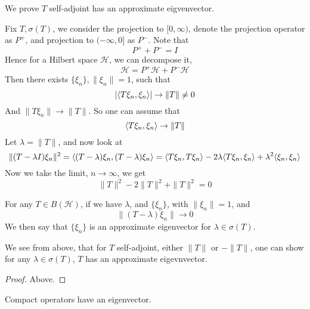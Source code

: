 \begin{proposition}
    We prove $T$ self-adjoint has an approximate eigvenvector.
\end{proposition}
Fix $T, \sigma(T)$, we consider the projection to $[0,\infty)$, denote the projection operator as $P^+$, and projection to $(-\infty, 0]$ as $P^-$. Note that 
\begin{equation*}
    P^++P^-=I 
\end{equation*}
Hence for a Hilbert space $\mathcal{H}$, we can decompose it,
\begin{equation*}
    \mathcal{H}=P^+\mathcal{H}+P^-\mathcal{H}
\end{equation*}
Then there exists $\{\xi_n\}, \|\xi_n\|=1$, such that 
\begin{equation*}
    |\langle T\xi_n, \xi_n\rangle|\to \|T\|\neq 0
\end{equation*}
And $\|T\xi_n\|\to \|T\|$. So one can assume that 
\begin{equation*}
    \langle T\xi_n, \xi_n\rangle\to \|T\|
\end{equation*}
Let $\lambda=\|T\|$, and now look at 
\begin{equation*}
    \|(T-\lambda I)\xi_n\|^2=\langle (T-\lambda)\xi_n, (T-\lambda)\xi_n\rangle=\langle T\xi_n, T\xi_n\rangle-2\lambda\langle T\xi_n, \xi_n\rangle +\lambda^2\langle \xi_n, \xi_n\rangle
\end{equation*}
Now we take the limit, $n\to\infty$, we get
\begin{equation*}
    \|T\|^2-2\|T\|^2+\|T\|^2=0
\end{equation*}
\begin{definition}
    For any $T\in B(\mathcal{H})$, if we have $\lambda$, and $\{\xi_n\}$, with $\|\xi_n\|=1$, and 
    \begin{equation*}
        \|(T-\lambda)\xi_n\|\to 0
    \end{equation*}
    We then say that $\{\xi_n\}$ is an approximate eigenvector for $\lambda\in\sigma(T)$.
\end{definition}
\begin{corollary}
    We see from above, that for $T$ self-adjoint, either $\|T\|$ or $-\|T\|$, one can show for any $\lambda\in\sigma(T)$, $T$ has an approximate eigevnvector.
\end{corollary}
\begin{proof}
    Above.
\end{proof}
\begin{proposition}
    Compact operators have an eigenvector.
\end{proposition}

